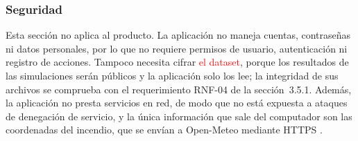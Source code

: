 \subsubsection{Seguridad}
Esta sección no aplica al producto. La aplicación no maneja cuentas, contraseñas ni datos personales, por lo que no requiere permisos de usuario, autenticación ni registro de acciones. Tampoco necesita cifrar \textcolor{red}{el dataset}, porque los resultados de las simulaciones serán públicos y la aplicación solo los lee; la integridad de sus archivos se comprueba con el requerimiento RNF-04 de la sección~3.5.1. Además, la aplicación no presta servicios en red, de modo que no está expuesta a ataques de denegación de servicio, y la única información que sale del computador son las coordenadas del incendio, que se envían a Open-Meteo mediante HTTPS .